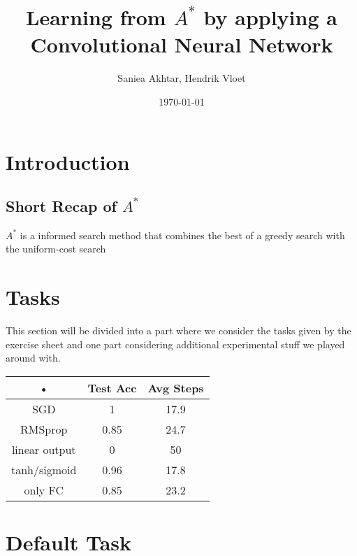 \documentclass[a4paper]{article}
\title{Learning from $A^*$ by applying a Convolutional Neural Network}
\author{Saniea Akhtar, Hendrik Vloet}
\date{\today}
\begin{document}
\maketitle
\section{Introduction}

\subsection{Short Recap of $A^*$}

$A^*$ is a informed search method that combines the best of a greedy search with the uniform-cost search




\section{Tasks}
This section will be divided into a part where we consider the tasks given by the exercise sheet and one part considering additional experimental stuff we played around with.

\begin{tabular}{|c|c|c|}
\hline 
• & Test Acc & Avg Steps \\ 
\hline 
SGD & 1 & 17.9 \\ 
\hline 
RMSprop & 0.85 & 24.7 \\ 
\hline 
linear output & 0 & 50 \\ 
\hline 
tanh/sigmoid & 0.96 & 17.8 \\ 
\hline 
only FC & 0.85 & 23.2 \\ 
\hline 
\end{tabular} 


\section{Default Task}


\subsection{}


\begin{thebibliography}{9}
  
\end{thebibliography}
\end{document}
